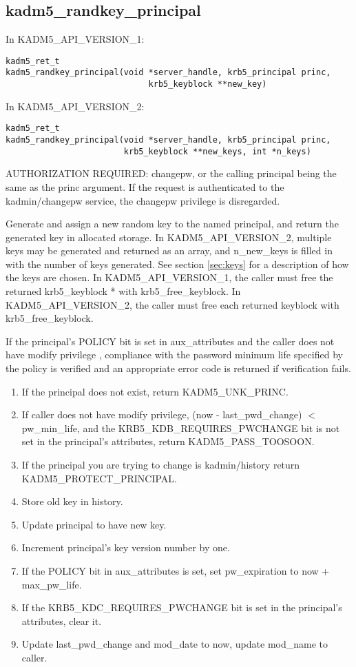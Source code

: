 \subsection{kadm5_randkey_principal}

In KADM5_API_VERSION_1:

\begin{verbatim}
kadm5_ret_t
kadm5_randkey_principal(void *server_handle, krb5_principal princ,
                             krb5_keyblock **new_key)
\end{verbatim}

In KADM5_API_VERSION_2:

\begin{verbatim}
kadm5_ret_t
kadm5_randkey_principal(void *server_handle, krb5_principal princ,
                        krb5_keyblock **new_keys, int *n_keys)
\end{verbatim}

AUTHORIZATION REQUIRED: changepw, or the calling principal being the
same as the princ argument.  If the request is authenticated to the
kadmin/changepw service, the changepw privilege is disregarded.

Generate and assign a new random key to the named principal, and
return the generated key in allocated storage.  In
KADM5_API_VERSION_2, multiple keys may be generated and returned as an
array, and n_new_keys is filled in with the number of keys generated.
See section \ref{sec:keys} for a description of how the keys are
chosen.  In KADM5_API_VERSION_1, the caller must free the returned
krb5_keyblock * with krb5_free_keyblock.  In KADM5_API_VERSION_2, the
caller must free each returned keyblock with krb5_free_keyblock.

If the principal's POLICY bit is set in aux_attributes and the caller does
not have modify privilege , compliance with the password minimum life
specified by the policy is verified and an appropriate error code is returned
if verification fails. 

\begin{enumerate}
\item If the principal does not exist, return KADM5_UNK_PRINC.
\item If caller does not have modify privilege, (now - last_pwd_change) $<$
pw_min_life, and the KRB5_KDB_REQUIRES_PWCHANGE bit is not set in the
principal's attributes, return KADM5_PASS_TOOSOON.
\item If the principal you are trying to change is kadmin/history return
KADM5_PROTECT_PRINCIPAL.
\item Store old key in history.
\item Update principal to have new key.
\item Increment principal's key version number by one.
\item If the POLICY bit in aux_attributes is set, set pw_expiration to
now + max_pw_life.
\item If the KRB5_KDC_REQUIRES_PWCHANGE bit is set in the principal's
attributes, clear it.
\item Update last_pwd_change and mod_date to now, update mod_name to
caller.
\end{enumerate}

